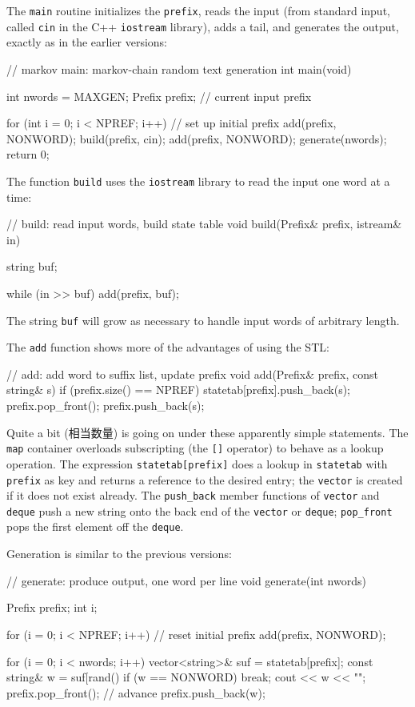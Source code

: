The \verb'main' routine initializes the \verb'prefix', reads the input
(from standard input, called \verb'cin' in the C++ \verb'iostream'
library), adds a tail, and generates the output, exactly as in the earlier
versions:
\begin{wellcode}
    // markov main: markov-chain random text generation
    int main(void)
    {
        int nwords = MAXGEN;
        Prefix prefix;  // current input prefix

        for (int i = 0; i < NPREF; i++) // set up initial prefix
            add(prefix, NONWORD);
        build(prefix, cin);
        add(prefix, NONWORD);
        generate(nwords);
        return 0;
    }
\end{wellcode}

The function \verb'build' uses the \verb'iostream' library to read the
input one word at a time:
\begin{wellcode}
    // build: read input words, build state table
    void build(Prefix& prefix, istream& in)
    {
        string buf;

        while (in >> buf)
        add(prefix, buf);
    }
\end{wellcode}
The string \verb'buf' will grow as necessary to handle input words of
arbitrary length.

The \verb'add' function shows more of the advantages of using the STL:
\begin{wellcode}
    // add: add word to suffix list, update prefix
    void add(Prefix& prefix, const string& s)
    {
        if (prefix.size() == NPREF) {
            statetab[prefix].push_back(s);
            prefix.pop_front();
        }
        prefix.push_back(s);
    }
\end{wellcode}

Quite a bit (相当数量) is going on under these apparently simple
statements. The \verb'map' container overloads subscripting (the \verb'[]'
operator) to behave as a lookup operation.  The expression
\verb'statetab[prefix]' does a lookup in \verb'statetab' with \verb'prefix'
as key and returns a reference to the desired entry; the \verb'vector' is
created if it does not exist already. The \verb'push_back' member functions
of \verb'vector' and \verb'deque' push a new string onto the back end of
the \verb'vector' or \verb'deque'; \verb'pop_front' pops the first element
off the \verb'deque'.

Generation is similar to the previous versions:
\begin{wellcode}
    // generate: produce output, one word per line
    void generate(int nwords)
    {
        Prefix prefix;
        int i;

        for (i = 0; i < NPREF; i++) // reset initial prefix
            add(prefix, NONWORD);

        for (i = 0; i < nwords; i++) {
            vector<string>& suf = statetab[prefix];
            const string& w = suf[rand() %
            if (w == NONWORD)
                break;
            cout << w << "\n";
            prefix.pop_front(); // advance
            prefix.push_back(w);
        }
    }
\end{wellcode}


